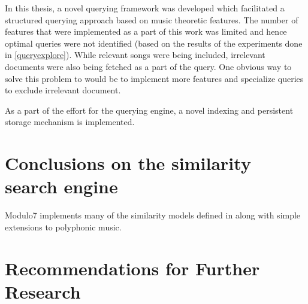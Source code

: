 \noindent In this thesis, a novel querying framework was developed which facilitated a structured querying approach based on music theoretic features. The number of features that were implemented as a part of this work was limited and hence optimal queries were not identified (based on the results of the experiments done in \ref{queryexplore}). While relevant songs were being included, irrelevant documents were also being fetched as a part of the query. One obvious way to solve this problem to would be to implement more features and specialize queries to exclude irrelevant document. 

\noindent As a part of the effort for the querying engine, a novel indexing and persistent storage mechanism is implemented. 

\section{Conclusions on the similarity search engine}

\noindent Modulo7 implements many of the similarity models defined in \cite{similietechnicalmanual} along with simple extensions to polyphonic music. 

\section{Recommendations for Further Research}

\noindent 